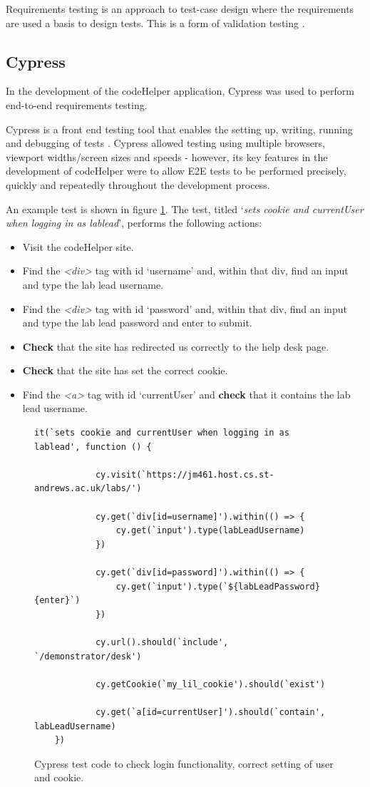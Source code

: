 Requirements testing is an approach to test-case design where the requirements are used a basis to design tests. This is a form of validation testing \cite{sommerville}.

\subsection{Cypress}
In the development of the codeHelper application, Cypress \cite{cypress} was used to perform end-to-end requirements testing.

Cypress is a front end testing tool that enables the setting up, writing, running and debugging of tests \cite{cypress}. Cypress allowed testing using multiple browsers, viewport widths/screen sizes and speeds - however, its key features in the development of codeHelper were to allow E2E tests to be performed precisely, quickly and repeatedly throughout the development process. 

An example test is shown in figure \ref{fig:cyptest}. The test, titled `\textit{sets cookie and currentUser when logging in as lablead}', performs the following actions:

\begin{itemize}
    \item Visit the codeHelper site.
    \item Find the \textit{<div>} tag with id `username' and, within that div, find an input and type the lab lead username.
    \item Find the \textit{<div>} tag with id `password' and, within that div, find an input and type the lab lead password and enter to submit.
    \item \textbf{Check} that the site has redirected us correctly to the help desk page.
    \item \textbf{Check} that the site has set the correct cookie.
    \item Find the \textit{<a>} tag with id `currentUser' and \textbf{check} that it contains the lab lead username.
\end{itemize}

\begin{figure}[H]
    \begin{lstlisting}[frame=single]
it(`sets cookie and currentUser when logging in as lablead', function () {

    		cy.visit(`https://jm461.host.cs.st-andrews.ac.uk/labs/')

	    	cy.get(`div[id=username]').within(() => {
			    cy.get(`input').type(labLeadUsername)
		    })

	    	cy.get(`div[id=password]').within(() => {
		   	    cy.get(`input').type(`${labLeadPassword}{enter}`)
		   	})

		    cy.url().should(`include', `/demonstrator/desk')

		    cy.getCookie(`my_lil_cookie').should(`exist')

		    cy.get(`a[id=currentUser]').should(`contain', labLeadUsername)
	}) 
    \end{lstlisting}
        \caption{Cypress test code to check login functionality, correct setting of user and cookie.}
    \label{fig:cyptest}
\end{figure}

